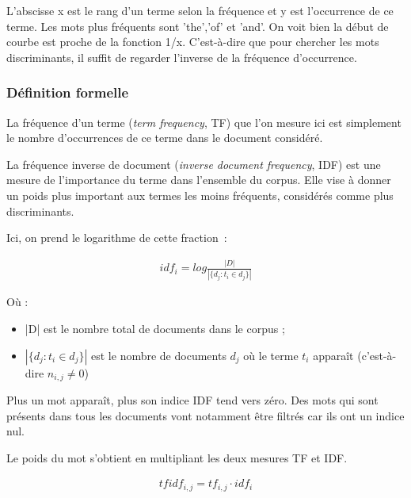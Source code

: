 \documentclass[a4paper, 12pt]{article}
\begin{document}
L'abscisse x est le rang d'un terme selon la fréquence et y est l'occurrence de ce terme. Les mots plus fréquents sont 'the','of' et 'and'. On voit bien la début de courbe est proche de la fonction 1/x. C'est-à-dire que pour chercher les mots discriminants, il suffit de regarder l'inverse de la fréquence d'occurrence.

\subsubsection{Définition formelle}

\begin{definition}[TF]
 La fréquence d'un terme (\textit{term frequency}, TF) que l'on mesure ici est simplement le nombre d'occurrences de ce terme dans le document considéré.
\end{definition}

\begin{definition}[IDF]
 La fréquence inverse de document (\textit{inverse document frequency}, IDF) est une mesure de l'importance du terme dans l'ensemble du corpus. Elle vise à donner un poids plus important aux termes les moins fréquents, considérés comme plus discriminants.
\end{definition}

Ici, on prend le logarithme de cette fraction~:

\begin{align}
 idf_{i} =  log \frac{|D|}{|\{d_{j}: t_{i} \in d_{j}\}|}
\end{align}

Où : 
\begin{itemize}
 \item |D| est le nombre total de documents dans le corpus ;
 \item $|\{d_{j} : t_{i} \in d_{j}\}|$ est le nombre de documents $d_j$ où le terme  $t_{i}$  apparaît (c'est-à-dire  $n_{i,j} \neq 0$)
\end{itemize}

Plus un mot apparaît, plus son indice IDF tend vers zéro. Des mots qui sont présents dans tous les documents vont notamment être filtrés car ils ont un indice nul.

\begin{definition}[TF-IDF]%
Le poids du mot s'obtient en multipliant les deux mesures TF et IDF.
\end{definition}

\begin{align}
 tfidf_{i,j} = tf_{i,j} \cdot  idf_{i}
\end{align}
\end{document}

